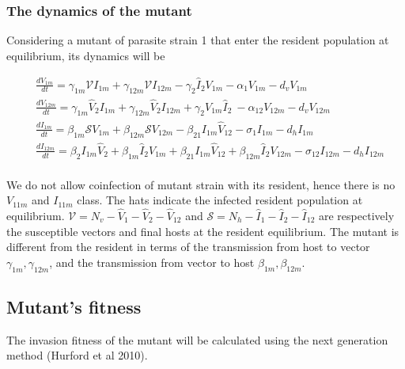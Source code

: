 \documentclass{article}
\begin{document}
\subsubsection{The dynamics of the mutant}

Considering a mutant of parasite strain 1 that enter the resident population at equilibrium, its dynamics will be

\begin{align*}
& \frac{dV_{1m}}{dt} = \gamma_{1m}  \mathcal{V} I_{1m} + \gamma_{12m} \mathcal{V} I_{12m} - \gamma_2 \hat{I}_2 V_{1m} - \alpha_1 V_{1m}  - d_v V_{1m} \\
& \frac{dV_{12m}}{dt} = \gamma_{1m} \hat{V}_2 I_{1m} +  \gamma_{12m} \hat{V}_2 I_{12m} + \gamma_2 V_{1m} \hat{I}_2 \
- \alpha_{12} V_{12m} - d_v V_{12m} \\
& \frac{dI_{1m}}{dt} =  \beta_{1m} \mathcal{S} V_{1m}  + \beta_{12m} \mathcal{S} V_{12m}  - \beta_{21} I_{1m} \hat{V}_{12} - \sigma_1 I_{1m}  - d_h I_{1m} \\
& \frac{dI_{12m}}{dt} = \beta_2 I_{1m} \hat{V}_2 +  \beta_{1m}  \hat{I}_2 V_{1m} + \beta_{21} I_{1m} \hat{V}_{12}  + 
\beta_{12m} \hat{I}_2 V_{12m}  - \sigma_12 I_{12m} - d_h I_{12m} \\
\end{align*}

We do not allow coinfection of mutant strain with its resident, hence there is no $V_{11m}$ and $I_{11m}$ class. The hats indicate the infected resident population at equilibrium. $\mathcal{V} = N_v - \hat{V}_1 - \hat{V}_2 - \hat{V}_{12}$ and $\mathcal{S} = N_h -\hat{I}_1 - \hat{I}_2 - \hat{I}_{12}$ are respectively the susceptible vectors and final hosts at the resident equilibrium. The mutant is different from the resident in terms of the transmission from host to vector $\gamma_{1m}, \gamma_{12m}$, and the transmission from vector to host $\beta_{1m}, \beta_{12m}$.

\subsection{Mutant's fitness}
The invasion fitness of the mutant will be calculated using the next generation method (Hurford et al 2010).
\end{document}
